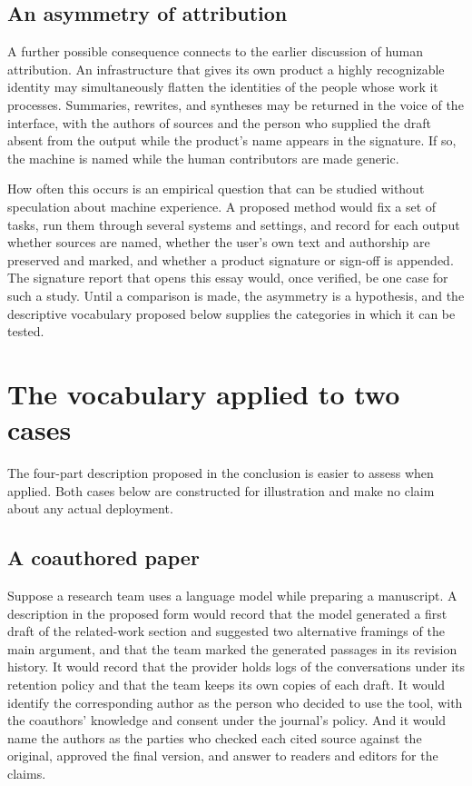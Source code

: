 \documentclass[11pt]{article}
\begin{document}
\subsection{An asymmetry of attribution}

A further possible consequence connects to the earlier discussion of human attribution. An infrastructure that gives its own product a highly recognizable identity may simultaneously flatten the identities of the people whose work it processes. Summaries, rewrites, and syntheses may be returned in the voice of the interface, with the authors of sources and the person who supplied the draft absent from the output while the product's name appears in the signature. If so, the machine is named while the human contributors are made generic.

How often this occurs is an empirical question that can be studied without speculation about machine experience. A proposed method would fix a set of tasks, run them through several systems and settings, and record for each output whether sources are named, whether the user's own text and authorship are preserved and marked, and whether a product signature or sign-off is appended. The signature report that opens this essay would, once verified, be one case for such a study. Until a comparison is made, the asymmetry is a hypothesis, and the descriptive vocabulary proposed below supplies the categories in which it can be tested.

\section{The vocabulary applied to two cases}

The four-part description proposed in the conclusion is easier to assess when applied. Both cases below are constructed for illustration and make no claim about any actual deployment.

\subsection{A coauthored paper}

Suppose a research team uses a language model while preparing a manuscript. A description in the proposed form would record that the model generated a first draft of the related-work section and suggested two alternative framings of the main argument, and that the team marked the generated passages in its revision history. It would record that the provider holds logs of the conversations under its retention policy and that the team keeps its own copies of each draft. It would identify the corresponding author as the person who decided to use the tool, with the coauthors' knowledge and consent under the journal's policy. And it would name the authors as the parties who checked each cited source against the original, approved the final version, and answer to readers and editors for the claims.
\end{document}
